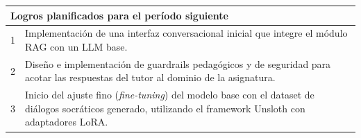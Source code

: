 \documentclass[12pt]{article}
\begin{document}
\vspace{1em}

\begin{table}[H]
    \begin{tabularx}{\textwidth}{|l|X|}
        \hline
        \multicolumn{2}{|l|}{\textbf{Logros planificados para el período siguiente}} \\
        \hline
        1 & Implementación de una interfaz conversacional inicial que integre el módulo RAG con un LLM base. \\
        \hline
        2 & Diseño e implementación de guardrails pedagógicos y de seguridad para acotar las respuestas del tutor al dominio de la asignatura. \\
        \hline
        3 & Inicio del ajuste fino (\textit{fine-tuning}) del modelo base con el dataset de diálogos socráticos generado, utilizando el framework Unsloth con adaptadores LoRA. \\
        \hline
    \end{tabularx}
\end{table}
\end{document}
